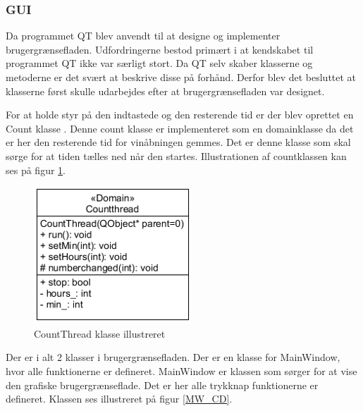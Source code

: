 \subsubsection{GUI}
Da programmet QT blev anvendt til at designe og implementer brugergrænsefladen. Udfordringerne bestod primært i at kendskabet til programmet QT ikke var særligt stort. Da QT selv skaber klasserne og metoderne er det svært at beskrive disse på forhånd. Derfor blev det besluttet at klasserne først skulle udarbejdes efter at brugergrænsefladen var designet. 

For at holde styr på den indtastede og den resterende tid er der blev oprettet en Count klasse . Denne count klasse er implementeret som en domainklasse da det er her den resterende tid for vinåbningen gemmes. Det er denne klasse som skal sørge for at tiden tælles ned når den startes. Illustrationen af countklassen kan ses på figur \ref{CT_CD}.

\begin{figure}[H]
	\centerline{\includegraphics[scale=1]{tex/Design/GUI/Fotos/CountThread}}
	\caption{CountThread klasse illustreret}
	\label{CT_CD}
\end{figure}

Der er i alt 2 klasser i brugergrænsefladen. Der er en klasse for MainWindow, hvor alle funktionerne er defineret. MainWindow er klassen som sørger for at vise den grafiske brugergrænseflade. Det er her alle trykknap funktionerne er defineret. Klassen ses illustreret på figur \ref{MW_CD}. 

